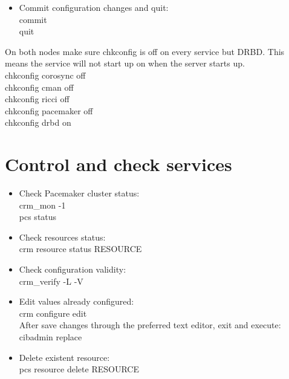 \documentclass[a4paper, 12pt]{book}
\begin{document}
\begin{itemize}
	\item Commit configuration changes and quit:\\
		commit\\
		quit
\end{itemize}

\noindent On both nodes make sure chkconfig is off on every service but DRBD. This means the service will not start up on when the server starts up.\\
	\indent chkconfig corosync off\\
	\indent chkconfig cman off\\
	\indent chkconfig ricci off\\
	\indent chkconfig pacemaker off\\
	\indent chkconfig drbd on

\section{Control and check services}
\label{sec:control}


\begin{itemize}
	\item Check Pacemaker cluster status:\\
		crm\_mon -1\\
		pcs status
\end{itemize}

\begin{itemize}
	\item Check resources status:\\
		crm resource status RESOURCE
\end{itemize}

\begin{itemize}
	\item Check configuration validity:\\
		crm\_verify -L -V
\end{itemize}

\begin{itemize}
	\item Edit values already configured:\\
		crm configure edit\\
	After save changes through the preferred text editor, exit and execute:\\
		cibadmin \textminus \textminus replace
\end{itemize}

\begin{itemize}
	\item Delete existent resource:\\
		pcs resource delete RESOURCE
\end{itemize}
\end{document}
